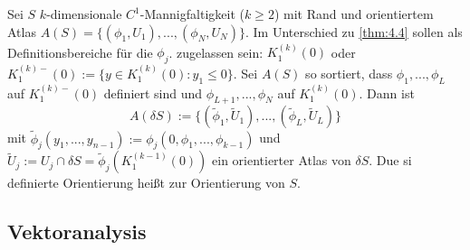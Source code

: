 \begin{theorem}[Definition] \label{thm:8.6}
Sei $S$ $k$-dimensionale $C^1$-Mannigfaltigkeit ($k\ge 2$) mit Rand und orientiertem Atlas $A(S)=\{(\phi_1, U_1), ..., (\phi_N, U_N)\}$. Im Unterschied zu \ref{thm:4.4} sollen als Definitionsbereiche für die $\phi_j$. zugelassen sein: $K_1^(k)(0)$ oder $ K_1^{(k)-}(0):=\{y\in K_1^{(k)}(0):y_1\le 0 \}$. Sei $A(S)$ so sortiert, dass $\phi_1,..., \phi_L$ auf $K_1^{(k)-}(0)$ definiert sind und $\phi_{L+1},..., \phi_N$ auf $K_1^{(k)}(0)$.
Dann ist 
\[
A(\delta S):=\{(\tilde \phi_1, \tilde U_1),...,(\tilde \phi_L, \tilde U_L)\} 
\]
mit $\tilde \phi_j(y_1,..., y_{n-1}):=\phi_j(0, \phi_1,..., \phi_{k-1})$ und $\tilde U_j:= U_j \cap \delta S=\tilde \phi_j(K_1^{(k-1)}(0))$ ein orientierter Atlas von $\delta S$. Due si definierte Orientierung heißt   zur Orientierung von $S$.
\end{theorem}
\subsection{Vektoranalysis}


